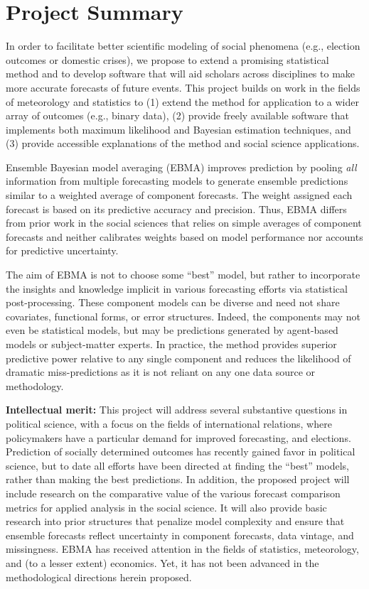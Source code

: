 \documentclass[pdftex,11pt,fullpage,oneside]{amsart}
\begin{document}
\section*{Project Summary}

\thispagestyle{empty}

In order to facilitate better scientific modeling of social phenomena
(e.g., election outcomes or domestic crises), we propose to extend a
promising statistical method and to develop software that will aid
scholars across disciplines to make more accurate forecasts of future
events.  This project builds on work in the fields of meteorology and
statistics to (1) extend the method for application to a wider array
of outcomes (e.g., binary data), (2) provide freely available software
that implements both maximum likelihood and Bayesian estimation
techniques, and (3) provide accessible explanations of the method and
social science applications.

Ensemble Bayesian model averaging (EBMA) improves prediction by
pooling \emph{all} information from multiple forecasting models to
generate ensemble predictions similar to a weighted average of
component forecasts.  The weight assigned each forecast is based on
its predictive accuracy and precision.  Thus, EBMA differs from prior
work in the social sciences that relies on simple averages of
component forecasts and neither calibrates weights based on model
performance nor accounts for predictive uncertainty.

The aim of EBMA is not to choose some ``best'' model, but rather to
incorporate the insights and knowledge implicit in various forecasting
efforts via statistical post-processing.  These component models can
be diverse and need not share covariates, functional forms, or error
structures. Indeed, the components may not even be statistical models,
but may be predictions generated by agent-based models or
subject-matter experts.  In practice, the method provides superior
predictive power relative to any single component and reduces the
likelihood of dramatic miss-predictions as it is not reliant on any
one data source or methodology.

{\bf Intellectual merit:} This project will address several
substantive questions in political science, with a focus on the fields
of international relations, where policymakers have a particular
demand for improved forecasting, and elections.  Prediction of socially
determined outcomes has recently gained favor in political science,
but to date all efforts have been directed at finding the ``best''
models, rather than making the best predictions.  In addition, the
proposed project will include research on the comparative value of the
various forecast comparison metrics for applied analysis in the social
science.  It will also provide basic research into prior structures
that penalize model complexity and ensure that ensemble forecasts
reflect uncertainty in component forecasts, data vintage, and
missingness.  EBMA has received attention in the fields of
statistics, meteorology, and (to a lesser extent) economics.  Yet, it
has not been advanced in the methodological directions herein
proposed.
\end{document}
